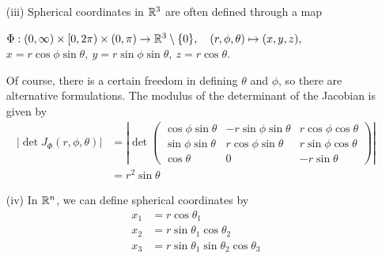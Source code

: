 \documentclass[12pt, t]{beamer}
\begin{document}
\begin{frame}[allowframebreaks]
\begin{itemize}
    \end{itemize}
    \newpage
    \begin{spacing}{1.2}
        \begin{itemize}
            \item[(iii)] Spherical coordinates in $\mathbb{R}^3$ are often defined through a map
                  \begin{center}
                      $\Phi:(0,\infty)\times[0,2\pi)\times(0,\pi)\to\mathbb{R}^3\setminus\{0\},\quad
                          (r,\phi,\theta)\mapsto(x,y,z),$\\
                      $x=r\cos\phi\sin\theta,~y=r\sin\phi\sin\theta,~z=r\cos\theta$.
                  \end{center}
                  Of course, there is a certain freedom in defining $\theta$ and $\phi$, so there are
                  alternative formulations. The modulus of the determinant of the
                  Jacobian is given by
                  \begin{equation*}
                      \begin{split}
                          |\det J_\Phi(r,\phi,\theta)| &=\left|\det\begin{pmatrix}
                              \cos\phi\sin\theta & -r\sin\phi\sin\theta & r\cos\phi\cos\theta \\
                              \sin\phi\sin\theta & r\cos\phi\sin\theta  & r\sin\phi\cos\theta \\
                              \cos\theta         & 0                    & -r\sin\theta
                          \end{pmatrix}\right| \\
                          &=r^2\sin\theta
                      \end{split}
                  \end{equation*}
        \end{itemize}
    \end{spacing}
    \newpage
    \begin{itemize}
        \item[(iv)] In $\mathbb{R}^n$, we can define spherical coordinates by
              \begin{align*}
                  x_1     & =r\cos\theta_1                                                   \\
                  x_2     & =r\sin\theta_1\cos\theta_2                                       \\
                  x_3     & =r\sin\theta_1\sin\theta_2\cos\theta_3                           \\

\end{align*}
\end{itemize}
\end{frame}
\end{document}
